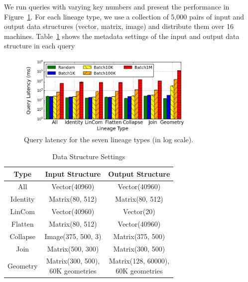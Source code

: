\documentclass{sig-alternate}
\begin{document}
We run queries with varying key numbers and present the performance in Figure~\ref{fig:typequery}. 
For each lineage type, we use a collection of 5,000 pairs of 
input and output data structures (vector, matrix, image) and distribute them over 16 machines.
Table~\ref{tb:typequery-stats} shows the metadata settings of the input and output data structure in each query

\begin{figure}[t]
\begin{center}
    \includegraphics[width=85mm]{pictures/TypeQuery-Time}
\caption {Query latency for the seven lineage types (in log scale).
    \label{fig:typequery}
}
\end{center}
\end{figure}

\begin{table}[t]
\begin{center}
    \caption{Data Structure Settings}
    \begin{scriptsize}
    \begin{tabular}{ | c | c | c |}
    \hline
    Type & Input Structure & Output Structure \\ \hline \hline
    All & Vector(40960) & Vector(40960) \\ \hline
    Identity & Matrix(80, 512) & Matrix(80, 512) \\ \hline
    LinCom & Vector(40960) & Vector(20) \\ \hline
    Flatten & Matrix(80, 512) & Vector(40960) \\ \hline
    Collapse & Image(375, 500, 3) & Matrix(375, 500) \\ \hline
    Join & Matrix(500, 300) & Matrix(300, 500) \\ \hline
    Geometry& \shortstack[l]{Matrix(300, 500), \\60K geometries} &  \shortstack[l]{Matrix(128, 60000), \\60K geometries} \\ \hline
    \end{tabular}
    \end{scriptsize}
    \label{tb:typequery-stats}
\end{center}   
\end{table}
\end{document}
